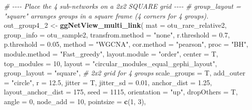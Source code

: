 \documentclass[
]{book}
\newenvironment{Shaded}{\begin{snugshade}}{\end{snugshade}}
\newcommand{\AttributeTok}[1]{\textcolor[rgb]{0.13,0.29,0.53}{#1}}
\newcommand{\CommentTok}[1]{\textcolor[rgb]{0.56,0.35,0.01}{\textit{#1}}}
\newcommand{\DecValTok}[1]{\textcolor[rgb]{0.00,0.00,0.81}{#1}}
\newcommand{\FloatTok}[1]{\textcolor[rgb]{0.00,0.00,0.81}{#1}}
\newcommand{\FunctionTok}[1]{\textcolor[rgb]{0.13,0.29,0.53}{\textbf{#1}}}
\newcommand{\NormalTok}[1]{#1}
\newcommand{\OtherTok}[1]{\textcolor[rgb]{0.56,0.35,0.01}{#1}}
\newcommand{\StringTok}[1]{\textcolor[rgb]{0.31,0.60,0.02}{#1}}
\begin{document}
\begin{Shaded}
\begin{Highlighting}[]
\CommentTok{\# {-}{-}{-}{-} Place the 4 sub{-}networks on a 2x2 SQUARE grid {-}{-}{-}{-}}
\CommentTok{\# \textasciigrave{}group\_layout = "square"\textasciigrave{} arranges groups in a square frame (4 corners for 4 groups).}
\NormalTok{out\_group4\_2 }\OtherTok{\textless{}{-}} \FunctionTok{ggNetView\_multi\_link}\NormalTok{(}
  \AttributeTok{mat                          =}\NormalTok{ otu\_rare\_relative2,}
  \AttributeTok{group\_info                   =}\NormalTok{ otu\_sample2,}
  \AttributeTok{transfrom.method             =} \StringTok{"none"}\NormalTok{,}
  \AttributeTok{r.threshold                  =} \FloatTok{0.7}\NormalTok{,}
  \AttributeTok{p.threshold                  =} \FloatTok{0.05}\NormalTok{,}
  \AttributeTok{method                       =} \StringTok{"WGCNA"}\NormalTok{,}
  \AttributeTok{cor.method                   =} \StringTok{"pearson"}\NormalTok{,}
  \AttributeTok{proc                         =} \StringTok{"BH"}\NormalTok{,}
  \AttributeTok{module.method                =} \StringTok{"Fast\_greedy"}\NormalTok{,}
  \AttributeTok{layout.module                =} \StringTok{"order"}\NormalTok{,}
  \AttributeTok{center                       =}\NormalTok{ T,}
  \AttributeTok{top\_modules                  =} \DecValTok{10}\NormalTok{,}
  \AttributeTok{layout                       =} \StringTok{"circular\_modules\_equal\_gephi\_layout"}\NormalTok{,}
  \AttributeTok{group\_layout                 =} \StringTok{"square"}\NormalTok{,      }\CommentTok{\# 2x2 grid for 4 groups}
  \AttributeTok{scale\_groups                 =}\NormalTok{ T,}
  \AttributeTok{add\_outer                    =} \StringTok{"circle"}\NormalTok{,}
  \AttributeTok{r                            =} \FloatTok{12.5}\NormalTok{,}
  \AttributeTok{jitter                       =}\NormalTok{ T,}
  \AttributeTok{jitter\_sd                    =} \FloatTok{0.01}\NormalTok{,}
  \AttributeTok{anchor\_dist                  =} \FloatTok{1.25}\NormalTok{,}
  \AttributeTok{layout\_anchor\_dist           =} \DecValTok{175}\NormalTok{,}
  \AttributeTok{seed                         =} \DecValTok{1115}\NormalTok{,}
  \AttributeTok{orientation                  =} \StringTok{"up"}\NormalTok{,}
  \AttributeTok{dropOthers                   =}\NormalTok{ T,}
  \AttributeTok{angle                        =} \DecValTok{0}\NormalTok{,}
  \AttributeTok{node\_add                     =} \DecValTok{10}\NormalTok{,}
  \AttributeTok{pointsize                    =} \FunctionTok{c}\NormalTok{(}\DecValTok{1}\NormalTok{, }\DecValTok{3}\NormalTok{),}

\end{Highlighting}
\end{Shaded}
\end{document}
